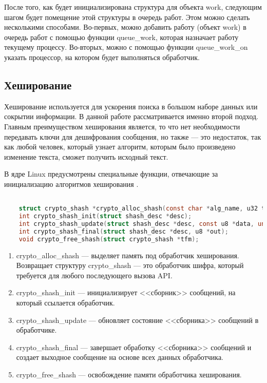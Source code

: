 После того, как будет инициализирована структура для объекта work, следующим шагом будет помещение этой структуры в очередь работ.
Этом можно сделать несколькими способами. 
Во-первых, можно добавить работу (объект work) в очередь работ с помощью функции queue\_work,
которая назначает работу текущему процессу.
Во-вторых, можно с помощью функции queue\_work\_on указать процессор, на котором будет выполняться обработчик.

\subsection{Хеширование}

Хеширование используется для ускорения поиска в большом наборе данных или сокрытии информации.
В данной работе рассматривается именно второй подход.
Главным преимуществом хеширования является, то что нет необходимости передавать ключи для дешифрования сообщения,
но также --- это недостаток, так как любой человек, который узнает алгоритм, которым было произведено изменение текста, сможет получить исходный текст.

В ядре Linux предусмотрены специальные функции, отвечающие за инициализацию алгоритмов хеширования \cite{hasg}.

\begin{lstlisting}[language=c, label=cringe, caption=Функции алгоритмов хеширования.]

    struct crypto_shash *crypto_alloc_shash(const char *alg_name, u32 type, u32 mask);
    int crypto_shash_init(struct shash_desc *desc);
    int crypto_shash_update(struct shash_desc *desc, const u8 *data, unsigned int len);
    int crypto_shash_final(struct shash_desc *desc, u8 *out);
    void crypto_free_shash(struct crypto_shash *tfm);

\end{lstlisting}

\begin{enumerate}
    \item crypto\_alloc\_shash --- выделяет память под обработчик хеширования. 
    Возвращает структуру crypto\_shash --- это обработчик шифра, который требуется для любого последующего вызова API.
    \item crypto\_shash\_init --- инициализирует <<сборник>> сообщений, на который ссылается обработчик.
    \item crypto\_shash\_update --- обновляет состояние <<сборника>> сообщений в обработчике.
    \item crypto\_shash\_final --- завершает обработку <<сборника>> сообщений и создает выходное сообщение на основе всех данных обработчика.
    \item crypto\_free\_shash --- освобождение памяти обработчика хеширования.
\end{enumerate}

